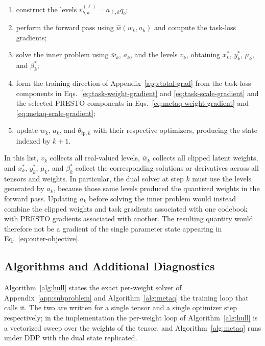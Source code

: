 \documentclass{article}
\begin{document}
\begin{enumerate}[label=(\arabic*),leftmargin=1.6em,nosep]
  \item construct the levels
        $v_{b,k}^{(\ell)}=a_{\ell,k}q_b$;
  \item perform the forward pass using
        $\widehat w(w_k,a_k)$ and compute the task-loss gradients;
  \item solve the inner problem using
        $\bar w_k$, $a_k$, and the levels $v_k$, obtaining
        $x_k^*$, $y_k^*$, $\mu_k$, and $\beta_k^*$;
  \item form the training direction of Appendix~\ref{app:total-grad} from the
        task-loss components in
        Eqs.~\eqref{eq:task-weight-gradient} and
        \eqref{eq:task-scale-gradient} and the selected PRESTO components in
        Eqs.~\eqref{eq:metaq-weight-gradient} and
        \eqref{eq:metaq-scale-gradient};
  \item update $w_k$, $a_k$, and $\theta_{\mathrm{fp},k}$ with their
        respective optimizers, producing the state indexed by $k+1$.
\end{enumerate}

In this list, $v_k$ collects all real-valued levels, $\bar w_k$ collects all
clipped latent weights, and $x_k^*$, $y_k^*$, $\mu_k$, and $\beta_k^*$ collect
the corresponding solutions or derivatives across all tensors and weights.
In particular, the dual solver at step $k$ must use the levels generated by
$a_k$, because those same levels produced the quantized weights in the forward
pass. Updating $a_k$ before solving the inner problem would instead combine the
clipped weights and task gradients associated with one codebook with PRESTO
gradients associated with another. The resulting quantity would therefore not
be a gradient of the single parameter state appearing in
Eq.~\eqref{eq:outer-objective}.



\subsection{Algorithms and Additional Diagnostics}
\label{app:algorithms}

Algorithm~\ref{alg:hull} states the exact per-weight solver of
Appendix~\ref{app:subproblem} and Algorithm~\ref{alg:metaq} the training loop
that calls it. The two are written for a single tensor and a single optimizer
step respectively; in the implementation the per-weight loop of
Algorithm~\ref{alg:hull} is a vectorized sweep over the weights of the tensor,
and Algorithm~\ref{alg:metaq} runs under DDP with the dual state replicated.
\end{document}
